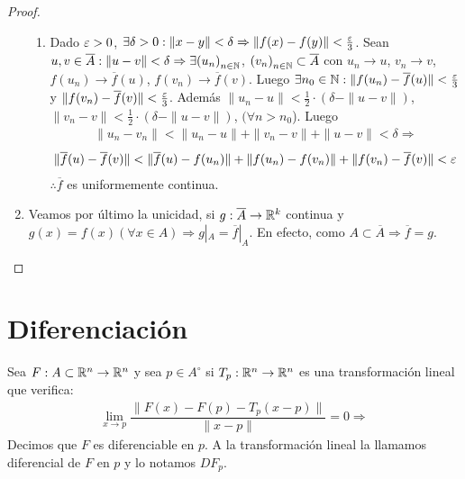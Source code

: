 \begin{theorem}
\begin{proof}
\begin{enumerate}
\begin{enumerate}
              \item Dado \(\varepsilon > 0\), \(\exists \delta > 0 : \|x-y\| < \delta \Rightarrow \|f(x) - f(y)\| < \frac{\varepsilon}{3} \). Sean \(u, v \in \overline{A} : \|u - v\| < \delta \Rightarrow \exists {(u_n)}_{n \in \mathbb{N}} \), \({(v_n)}_{n \in \mathbb{N}} \subset \overline{A} \) con \(u_n \to u\), \(v_n \to v\), \(f(u_n) \to \overline{f}(u)\), \(f(v_n) \to \overline{f}(v)\). Luego \(\exists n_0 \in \mathbb{N} : \|f(u_n) - \overline{f}(u)\| < \frac{\varepsilon}{3} \) y \( \|f(v_n) - \overline{f}(v)\| < \frac{\varepsilon}{3} \). Además \( \|u_n - u\| < \frac{1}{2} \cdot (\delta - \|u - v\|)\), \( \|v_n - v\| < \frac{1}{2} \cdot (\delta - \|u - v\|)\), \((\forall n > n_0\)). Luego \begin{align*}
                      \|u_n - v_n\| < \|u_n - u\| + \|v_n - v\| + \|u - v\| < \delta \Rightarrow
                    \end{align*}
                    \begin{align*}
                      \|\overline{f}(u) - \overline{f}(v)\| < \|\overline{f}(u) - f(u_n)\| + \|f(u_n) - f(v_n)\| + \|f(v_n) - \overline{f}(v)\| < \varepsilon
                    \end{align*} \(\therefore \overline{f} \) es uniformemente continua.
            \end{enumerate}
      \item Veamos por último la unicidad, si \(g: \overline{A} \to \mathbb{R}^k\) continua y \(g(x) = f(x) (\forall x \in A) \Rightarrow g|_A = \overline{f}|_A\). En efecto, como \(A \subset \overline{A} \Rightarrow \overline{f} = g\).
    \end{enumerate}
  \end{proof}
\end{theorem}

\section{Diferenciación}

\begin{definition}
  Sea \(F : A \subset \mathbb{R}^n \to \mathbb{R}^n\) y sea \(p \in A^{\circ} \) si \(T_p : \mathbb{R}^n \to \mathbb{R}^n\) es una transformación lineal que verifica:
  \begin{align*}
    \lim_{x \to p} \dfrac{\| F(x) - F(p) - T_p(x-p) \|}{\|x-p\|} = 0 \Rightarrow
  \end{align*} Decimos que \(F\) es diferenciable en \(p\). A la transformación lineal la llamamos diferencial de \(F\) en \(p\) y lo notamos \(DF_p\).
\end{definition}

